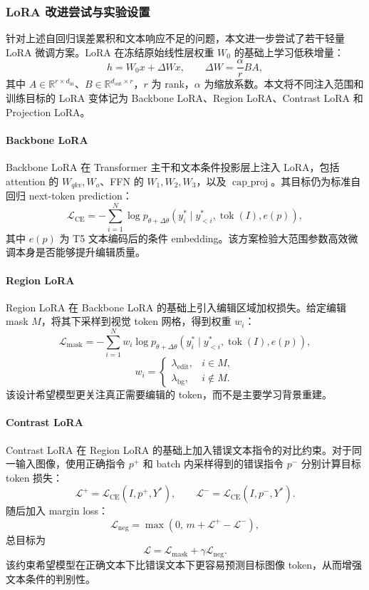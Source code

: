 \documentclass[UTF8,11pt,a4paper,fontset=fandol]{ctexart}
\begin{document}
\subsubsection{LoRA 改进尝试与实验设置}

针对上述自回归误差累积和文本响应不足的问题，本文进一步尝试了若干轻量 LoRA 微调方案。LoRA 在冻结原始线性层权重 \(W_0\) 的基础上学习低秩增量：
\[
h = W_0x + \Delta W x,\qquad
\Delta W = \frac{\alpha}{r}BA,
\]
其中 \(A\in\mathbb{R}^{r\times d_{\mathrm{in}}}\)、\(B\in\mathbb{R}^{d_{\mathrm{out}}\times r}\)，\(r\) 为 rank，\(\alpha\) 为缩放系数。本文将不同注入范围和训练目标的 LoRA 变体记为 Backbone LoRA、Region LoRA、Contrast LoRA 和 Projection LoRA。

\paragraph{Backbone LoRA}
Backbone LoRA 在 Transformer 主干和文本条件投影层上注入 LoRA，包括 attention 的 \(W_{qkv},W_o\)、FFN 的 \(W_1,W_2,W_3\)，以及 \(\operatorname{cap\_proj}\)。其目标仍为标准自回归 next-token prediction：
\[
\mathcal{L}_{\mathrm{CE}}
=-\sum_{i=1}^{N}\log p_{\theta+\Delta\theta}
(y_i^\ast\mid y_{<i}^\ast,\operatorname{tok}(I),e(p)),
\]
其中 \(e(p)\) 为 T5 文本编码后的条件 embedding。该方案检验大范围参数高效微调本身是否能够提升编辑质量。

\paragraph{Region LoRA}
Region LoRA 在 Backbone LoRA 的基础上引入编辑区域加权损失。给定编辑 mask \(M\)，将其下采样到视觉 token 网格，得到权重 \(w_i\)：
\[
\mathcal{L}_{\mathrm{mask}}
=-\sum_{i=1}^{N}w_i
\log p_{\theta+\Delta\theta}
(y_i^\ast\mid y_{<i}^\ast,\operatorname{tok}(I),e(p)),
\]
\[
w_i=
\begin{cases}
\lambda_{\mathrm{edit}}, & i\in M,\\
\lambda_{\mathrm{bg}}, & i\notin M.
\end{cases}
\]
该设计希望模型更关注真正需要编辑的 token，而不是主要学习背景重建。

\paragraph{Contrast LoRA}
Contrast LoRA 在 Region LoRA 的基础上加入错误文本指令的对比约束。对于同一输入图像，使用正确指令 \(p^+\) 和 batch 内采样得到的错误指令 \(p^-\) 分别计算目标 token 损失：
\[
\mathcal{L}^{+}=\mathcal{L}_{\mathrm{CE}}(I,p^+,Y^\ast),\qquad
\mathcal{L}^{-}=\mathcal{L}_{\mathrm{CE}}(I,p^-,Y^\ast).
\]
随后加入 margin loss：
\[
\mathcal{L}_{\mathrm{neg}}
=\max(0,\,m+\mathcal{L}^{+}-\mathcal{L}^{-}),
\]
总目标为
\[
\mathcal{L}
=\mathcal{L}_{\mathrm{mask}}+\gamma\mathcal{L}_{\mathrm{neg}}.
\]
该约束希望模型在正确文本下比错误文本下更容易预测目标图像 token，从而增强文本条件的判别性。
\end{document}
